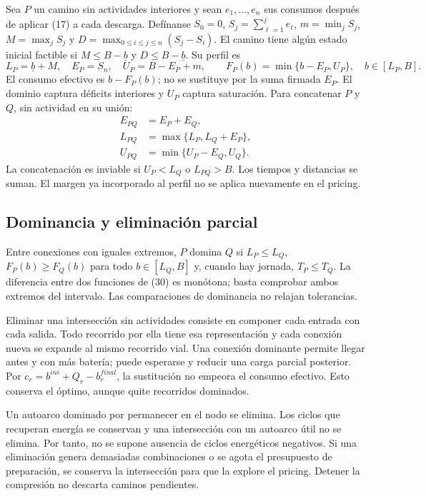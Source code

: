\documentclass[11pt,a4paper]{article}
\newcommand{\reserve}{\underline b}
\begin{document}
Sea $P$ un camino sin actividades interiores y sean $e_1,\ldots,e_n$ sus consumos
después de aplicar (17) a cada descarga. Defínanse $S_0=0$,
$S_j=\sum_{\ell=1}^j e_\ell$, $m=\min_j S_j$, $M=\max_j S_j$ y
$D=\max_{0\le i\le j\le n}(S_j-S_i)$. El camino tiene algún estado inicial
factible si $M\le B-\reserve$ y $D\le B-\reserve$. Su perfil es
\begin{equation}
 L_P=\reserve+M,\quad E_P=S_n,\quad U_P=B-E_P+m,\qquad
 F_P(b)=\min\{b-E_P,U_P\},\quad b\in[L_P,B]. \tag{30}
\end{equation}
El consumo efectivo es $b-F_P(b)$; no se sustituye por la suma firmada $E_P$.
El dominio captura déficits interiores y $U_P$ captura saturación.
Para concatenar $P$ y $Q$, sin actividad en su unión:
\begin{equation}
\begin{split}
E_{PQ}&=E_P+E_Q,\\
L_{PQ}&=\max\{L_P,L_Q+E_P\},\\
U_{PQ}&=\min\{U_P-E_Q,U_Q\}.
\end{split} \tag{31}
\end{equation}
La concatenación es inviable si $U_P<L_Q$ o $L_{PQ}>B$.
Los tiempos y distancias se suman. El margen ya incorporado al perfil no se
aplica nuevamente en el pricing.

\subsection{Dominancia y eliminación parcial}

Entre conexiones con iguales extremos, $P$ domina $Q$ si
$L_P\le L_Q$, $F_P(b)\ge F_Q(b)$ para todo $b\in[L_Q,B]$ y, cuando hay jornada,
$T_P\le T_Q$. La diferencia entre dos funciones de (30) es monótona; basta
comprobar ambos extremos del intervalo. Las comparaciones de dominancia no
relajan tolerancias.

Eliminar una intersección sin actividades consiste en componer cada entrada
con cada salida. Todo recorrido por ella tiene esa representación y cada
conexión nueva se expande al mismo recorrido vial. Una conexión dominante
permite llegar antes y con más batería; puede esperarse y reducir una carga
parcial posterior. Por $c_r=b^{ini}+Q_r-b_r^{final}$, la sustitución no empeora
el consumo efectivo. Esto conserva el óptimo, aunque quite recorridos dominados.

Un autoarco dominado por permanecer en el nodo se elimina. Los ciclos que
recuperan energía se conservan y una intersección con un autoarco útil no se
elimina. Por tanto, no se supone ausencia de ciclos energéticos negativos.
Si una eliminación genera demasiadas combinaciones o se agota el presupuesto
de preparación, se conserva la intersección para que la explore el pricing.
Detener la compresión no descarta caminos pendientes.
\end{document}
